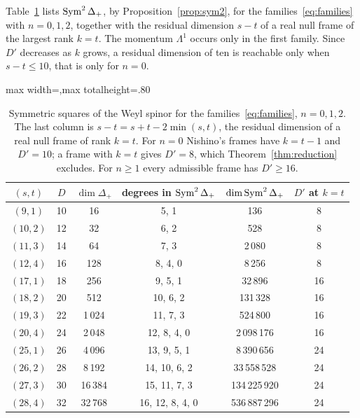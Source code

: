 Table~\ref{tab:sym2} lists $\operatorname{Sym}^2\Delta_+$, by Proposition~\ref{prop:sym2}, for the families~\eqref{eq:families} with $n=0,1,2$, together with the residual dimension $s-t$ of a real null frame of the largest rank $k=t$. The momentum $\Lambda^1$ occurs only in the first family. Since $D'$ decreases as $k$ grows, a residual dimension of ten is reachable only when $s-t\le10$, that is only for $n=0$.

\begin{table}[htbp]
\centering
\begin{adjustbox}{max width=\linewidth,max totalheight=.80\textheight}\begin{tabular}{@{}cccccc@{}}
\toprule
$(s,t)$ & $D$ & $\dim\Delta_+$ & degrees in $\operatorname{Sym}^2\Delta_+$ & $\dim\operatorname{Sym}^2\Delta_+$ & $D'$ at $k=t$ \\
\midrule
$(9,1)$ & 10 & 16 & 5, 1 & 136 & 8\\
$(10,2)$ & 12 & 32 & 6, 2 & 528 & 8\\
$(11,3)$ & 14 & 64 & 7, 3 & 2\,080 & 8\\
$(12,4)$ & 16 & 128 & 8, 4, 0 & 8\,256 & 8\\
\midrule
$(17,1)$ & 18 & 256 & 9, 5, 1 & 32\,896 & 16\\
$(18,2)$ & 20 & 512 & 10, 6, 2 & 131\,328 & 16\\
$(19,3)$ & 22 & 1\,024 & 11, 7, 3 & 524\,800 & 16\\
$(20,4)$ & 24 & 2\,048 & 12, 8, 4, 0 & 2\,098\,176 & 16\\
\midrule
$(25,1)$ & 26 & 4\,096 & 13, 9, 5, 1 & 8\,390\,656 & 24\\
$(26,2)$ & 28 & 8\,192 & 14, 10, 6, 2 & 33\,558\,528 & 24\\
$(27,3)$ & 30 & 16\,384 & 15, 11, 7, 3 & 134\,225\,920 & 24\\
$(28,4)$ & 32 & 32\,768 & 16, 12, 8, 4, 0 & 536\,887\,296 & 24\\
\bottomrule
\end{tabular}\end{adjustbox}
\caption{Symmetric squares of the Weyl spinor for the families~\eqref{eq:families}, $n=0,1,2$. The last column is $s-t=s+t-2\min(s,t)$, the residual dimension of a real null frame of rank $k=t$. For $n=0$ Nishino's frames have $k=t-1$ and $D'=10$; a frame with $k=t$ gives $D'=8$, which Theorem~\ref{thm:reduction} excludes. For $n\ge1$ every admissible frame has $D'\ge16$.}
\label{tab:sym2}
\end{table}

\FloatBarrier
